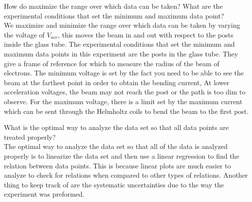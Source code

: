 \documentclass[aps,prl,10pt,twocolumn,floatfix]{revtex4-2}
\begin{document}
How do maximize the range over which data can be taken? What are the experimental conditions that
set the minimum and maximum data point?\\
We maximize and minimize the range over which data can be taken by varying the voltage of $V_{acc}$, this moves the beam in and out with respect to the posts inside the glass tube.
The experimental conditions that set the minimum and maximum data points in this experiment are the posts in the glass tube.
They give a frame of reference for which to measure the radius of the beam of electrons.
The minimum voltage is set by the fact you need to be able to see the beam at the farthest point in order to obtain the bending current, At lower acceleration voltages, the beam may not reach the post or the path is too dim to observe. For the maximum voltage, there is a limit set by the maximum current which can be sent through the Helmholtz coils to bend the beam to the first post.

What is the optimal way to analyze the data set so that all data points are treated properly?\\
The optimal way to analyze the data set so that all of the data is analyzed properly is to linearize the data set and then use a linear regression to find the relation between data points.
This is because linear plots are much easier to analyze to check for relations when compared to other types of relations.
Another thing to keep track of are the systematic uncertainties due to the way the experiment was preformed.
\end{document}
